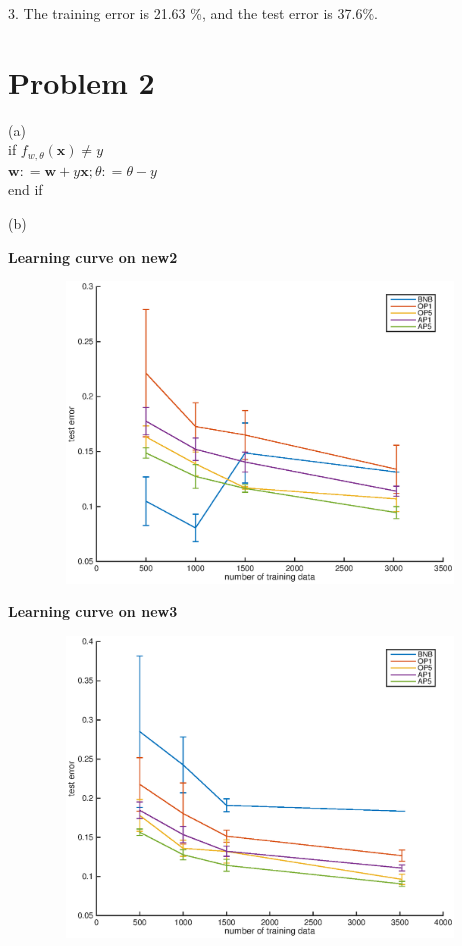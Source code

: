 \documentclass[twoside,11pt]{homework}
\begin{document}
3. The training error is 21.63 \%, and the test error is 37.6\%.
 
\section*{Problem 2}
(a)\\
if $ f_{w, \theta} (\pmb x) \neq y $\\
$\pmb w : = \pmb w + y\pmb x; \theta : = \theta - y$\\
end if

(b)\\
\begin{center}
\textbf{Learning curve on new2}\par\medskip
\includegraphics[width=150mm, height = 80mm]{new2.eps}
\end{center}

\begin{center}
\textbf{Learning curve on new3}\par\medskip
\includegraphics[width=150mm, height = 80mm]{new3.eps}
\end{center}
\end{document}
